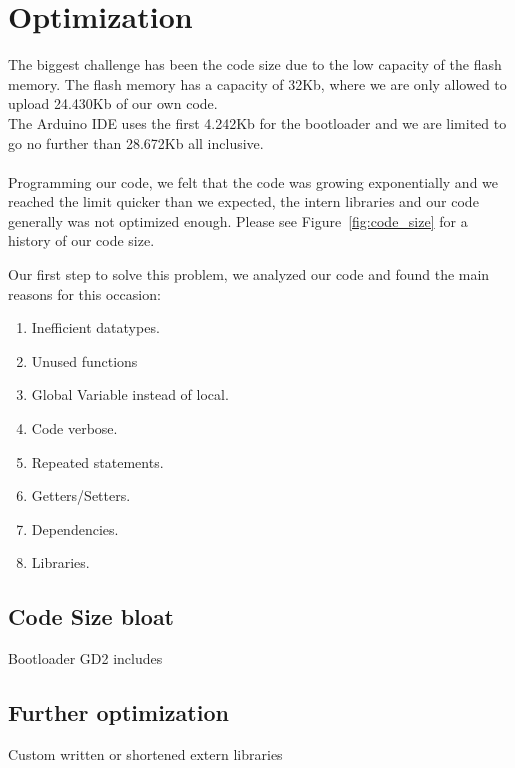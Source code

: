 \section{Optimization}%
The biggest challenge has been the code size due to the low capacity of the flash memory.
The flash memory has a capacity of 32Kb, where we are only allowed to upload 24.430Kb
of our own code. \\
The Arduino IDE uses the first 4.242Kb for the
bootloader and we are limited to go no further than 28.672Kb all inclusive.
\\
\\
Programming our code, we felt
that the code was growing exponentially and we reached the limit quicker than
we expected, the intern libraries and our code generally was not optimized enough. Please
see Figure~\ref{fig:code_size} for a history of our code size.

Our first step to solve this problem, we analyzed our code and found the main
reasons for this occasion:

\begin{enumerate}
\item Inefficient datatypes.
\item Unused functions
\item Global Variable instead of local.
\item Code verbose.
\item Repeated statements.
\item Getters/Setters.
\item Dependencies.
\item Libraries.
\end{enumerate}







\subsection{Code Size bloat}
Bootloader
GD2
includes
\subsection{Further optimization}
Custom written or shortened extern libraries

